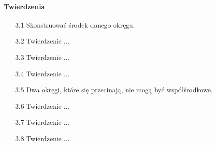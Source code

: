 \paragraph{Twierdzenia}
\begin{enumerate}
    \item [3.1] Skonstruować środek danego okręgu. 
    \item [3.2] Twierdzenie ...
    \item [3.3] Twierdzenie ...
    \item [3.4] Twierdzenie ...
    \item [3.5] Dwa okręgi, które się przecinają, nie mogą być współśrodkowe. 
    \item [3.6] Twierdzenie ...
    \item [3.7] Twierdzenie ...
    \item [3.8] Twierdzenie ...

\end{enumerate}

